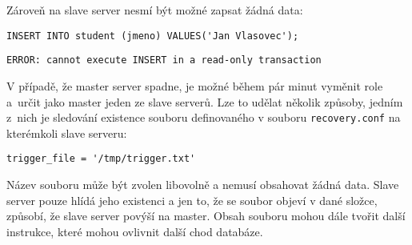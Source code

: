 Zároveň na slave server nesmí být možné zapsat žádná data:
\begin{lstlisting}
INSERT INTO student (jmeno) VALUES('Jan Vlasovec');
\end{lstlisting}
\begin{lstlisting}[keywordstyle=\color{black},identifierstyle=\color{black},stringstyle=\color{black}]
ERROR: cannot execute INSERT in a read-only transaction
\end{lstlisting}

V případě, že master server spadne, je možné během pár minut vyměnit role a~určit
jako master jeden ze slave serverů. Lze to udělat několik způsoby, jedním z~nich
je sledování existence souboru definovaného v souboru \texttt{recovery.conf} na
kterémkoli slave serveru:
\begin{lstlisting}
trigger_file = '/tmp/trigger.txt'
\end{lstlisting}

Název souboru může být zvolen libovolně a nemusí obsahovat žádná data. Slave
server pouze hlídá jeho existenci a jen to, že se soubor objeví v dané složce,
způsobí, že slave server povýší na master. Obsah souboru mohou dále tvořit další
instrukce, které mohou ovlivnit další chod databáze.

